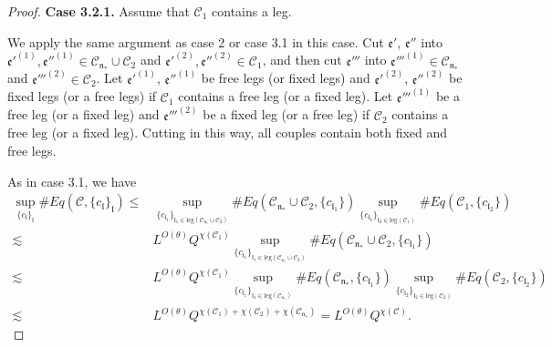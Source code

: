 \begin{proof}
    \textbf{Case 3.2.1.} Assume that $\mathcal{C}_1$ contains a leg. 
    
    We apply the same argument as case 2 or case 3.1 in this case. Cut $\mathfrak{e}'$, $\mathfrak{e}''$ into $\mathfrak{e}'^{(1)}, \mathfrak{e}''^{(1)}\in \mathcal{C}_{\mathfrak{n}_*}\cup \mathcal{C}_2$ and $\mathfrak{e}'^{(2)}, \mathfrak{e}''^{(2)}\in \mathcal{C}_1$, and then cut $\mathfrak{e}'''$ into $\mathfrak{e}'''^{(1)}\in \mathcal{C}_{\mathfrak{n}_*}$ and $\mathfrak{e}'''^{(2)}\in \mathcal{C}_2$. Let $\mathfrak{e}'^{(1)}$, $\mathfrak{e}''^{(1)}$ be free legs (or fixed legs) and $\mathfrak{e}'^{(2)}$, $\mathfrak{e}''^{(2)}$ be fixed legs (or a free legs) if $\mathcal{C}_1$ contains a free leg (or a fixed leg). Let $\mathfrak{e}'''^{(1)}$ be a free leg (or a fixed leg) and $\mathfrak{e}'''^{(2)}$ be a fixed leg (or a free leg) if $\mathcal{C}_2$ contains a free leg (or a fixed leg). Cutting in this way, all couples contain both fixed and free legs.
    
    As in case 3.1, we have
    \begin{equation}
    \begin{split}
     \sup_{\{c_{\mathfrak{l}}\}_{\mathfrak{l}}}\#Eq(\mathcal{C},\{c_{\mathfrak{l}}\}_{\mathfrak{l}})
     \le&
     \sup_{\{c_{\mathfrak{l}_1}\}_{\mathfrak{l}_1\in \text{leg}(\mathcal{C}_{\mathfrak{n}_*}\cup \mathcal{C}_2)} } \# Eq(\mathcal{C}_{\mathfrak{n}_*}\cup \mathcal{C}_2,\{c_{\mathfrak{l}_1}\}) \sup_{\{c_{\mathfrak{l}_2}\}_{\mathfrak{l}_2\in \text{leg}(\mathcal{C}_1)} }\# Eq(\mathcal{C}_{1}, \{c_{\mathfrak{l}_2}\})
     \\
     \lesssim& L^{O(\theta)} Q^{\chi(\mathcal{C}_1)}\sup_{\{c_{\mathfrak{l}_1}\}_{\mathfrak{l}_1\in \text{leg}(\mathcal{C}_{\mathfrak{n}_*}\cup \mathcal{C}_2)} } \# Eq(\mathcal{C}_{\mathfrak{n}_*}\cup \mathcal{C}_2,\{c_{\mathfrak{l}_1}\})
     \\
     \lesssim& L^{O(\theta)} Q^{\chi(\mathcal{C}_1)} \sup_{\{c_{\mathfrak{l}_1}\}_{\mathfrak{l}_1\in \text{leg}(\mathcal{C}_{\mathfrak{n}_*})} } \# Eq(\mathcal{C}_{\mathfrak{n}_*},\{c_{\mathfrak{l}_1}\}) \sup_{\{c_{\mathfrak{l}_2}\}_{\mathfrak{l}_2\in \text{leg}(\mathcal{C}_2)} }\# Eq(\mathcal{C}_{2}, \{c_{\mathfrak{l}_2}\})
     \\
     \lesssim& L^{O(\theta)} Q^{\chi(\mathcal{C}_1)+\chi(\mathcal{C}_2)+\chi(\mathcal{C}_{\mathfrak{n}_*})}=L^{O(\theta)} Q^{\chi(\mathcal{C})}.
    \end{split}
    \end{equation}
    

\end{proof}
